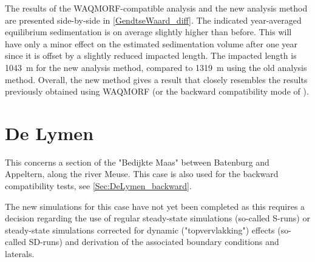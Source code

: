 The results of the WAQMORF-compatible analysis and the new analysis method are presented side-by-side in \autoref{GendtseWaard_diff}.
The indicated year-averaged equilibrium sedimentation is on average slightly higher than before.
This will have only a minor effect on the estimated sedimentation volume after one year since it is offset by a slightly reduced impacted length.
The impacted length is \SI{1043}{\metre} for the new analysis method, compared to \SI{1319}{\metre} using the old analysis method.
Overall, the new method gives a result that closely resembles the results previously obtained using WAQMORF (or the backward compatibility mode of \dfmi).

\section{De Lymen}\label{Sec:DeLymen}
This concerns a section of the "Bedijkte Maas" between Batenburg and Appeltern, along the river Meuse.
This case is also used for the backward compatibility tests, see \autoref{Sec:DeLymen_backward}.

The new simulations for this case have not yet been completed as this requires a decision regarding the use of regular steady-state simulations (so-called S-runs) or steady-state simulations corrected for dynamic ("topvervlakking") effects (so-called SD-runs) and derivation of the associated boundary conditions and laterals.



